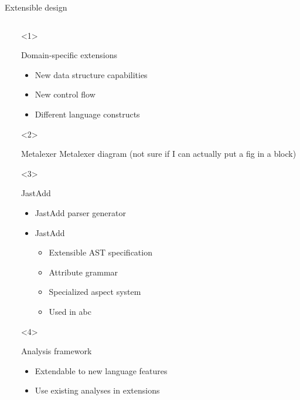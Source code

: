 \begin{frame}{Extensible design}
  \begin{columns}
    \begin{column}{5cm}
    \end{column}
    \begin{column}{5cm}
      \begin{onlyenv}<1>
        \begin{block}{Domain-specific extensions}
          \begin{itemize}
          \item New data structure capabilities
          \item New control flow
          \item Different language constructs
          \end{itemize}
        \end{block}
      \end{onlyenv}
      \begin{onlyenv}<2>
        \begin{block}{Metalexer}
          Metalexer diagram (not sure if I can actually put a fig in a block)
        \end{block}
      \end{onlyenv}
      \begin{onlyenv}<3>
        \begin{block}{JastAdd}
          \begin{itemize}
          \item JastAdd parser generator
          \item JastAdd 
            \begin{itemize}
            \item Extensible AST specification
            \item Attribute grammar
            \item Specialized aspect system
            \item Used in abc
            \end{itemize}
          \end{itemize}
        \end{block}
      \end{onlyenv}
      \begin{onlyenv}<4>
        \begin{block}{Analysis framework}
          \begin{itemize}
          \item Extendable to new language features
          \item Use existing analyses in extensions
          \end{itemize}
        \end{block}
      \end{onlyenv}
    \end{column}
  \end{columns}
\end{frame}
